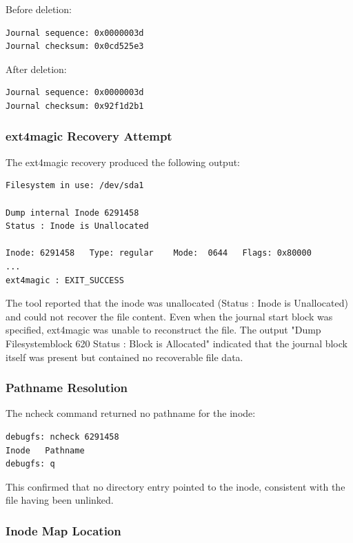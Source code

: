 Before deletion:

\begin{verbatim}
Journal sequence: 0x0000003d
Journal checksum: 0x0cd525e3
\end{verbatim}

After deletion:

\begin{verbatim}
Journal sequence: 0x0000003d
Journal checksum: 0x92f1d2b1
\end{verbatim}


\subsubsection*{ext4magic Recovery Attempt}

The ext4magic recovery produced the following output:

\begin{verbatim}
Filesystem in use: /dev/sda1

Dump internal Inode 6291458
Status : Inode is Unallocated

Inode: 6291458   Type: regular    Mode:  0644   Flags: 0x80000
...
ext4magic : EXIT_SUCCESS
\end{verbatim}

The tool reported that the inode was unallocated (Status : Inode is Unallocated) and could not recover the file content. Even when the journal start block was specified, 
ext4magic was unable to reconstruct the file. The output "Dump Filesystemblock 620 Status : Block is Allocated" indicated that the journal block itself was present but 
contained no recoverable file data.

\subsubsection*{Pathname Resolution}

The ncheck command returned no pathname for the inode:

\begin{verbatim}
debugfs: ncheck 6291458
Inode	Pathname
debugfs: q
\end{verbatim}

This confirmed that no directory entry pointed to the inode, consistent with the file having been unlinked.

\subsubsection*{Inode Map Location}

